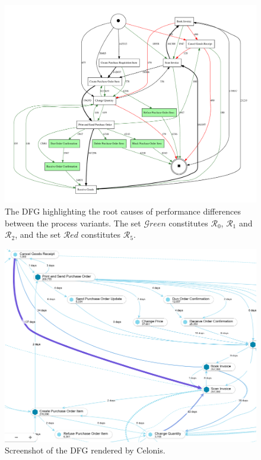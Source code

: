 \documentclass[acmsmall,screen, review]{acmart}
\begin{document}
\begin{figure}[h!]
	\centering
	\includegraphics[width=\textwidth]{fig/ch3/bpi-eg-vc}
	\caption{The DFG highlighting the root causes of performance differences between the process variants. The set $\mathcal{G}reen$ constitutes $\mathcal{R}_0$, $\mathcal{R}_1$ and $\mathcal{R}_2$, and the set $\mathcal{R}ed$ constitutes $\mathcal{R}_5$.}
	\label{fig3:bpi-eg-vc}
\end{figure}

\begin{figure}[h!]
	\centering
	\includegraphics[width=\textwidth]{fig/ch3/bpi-eg-celonis}
	\caption{Screenshot of the DFG rendered by Celonis.}
	\label{fig3:bpi-eg-celonis}
\end{figure}
\end{document}
